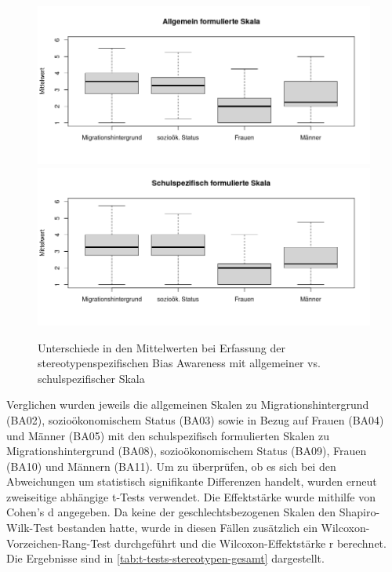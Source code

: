 \begin{figure}[h!]
	\includegraphics[width=\textwidth]{resources/boxplot-stereotypen-1-gesamt.png}
	\includegraphics[width=\textwidth]{resources/boxplot-stereotypen-2-gesamt.png}
	\caption{Unterschiede in den Mittelwerten bei Erfassung der stereotypenspezifischen Bias Awareness mit allgemeiner vs. schulspezifischer Skala}
	\label{fig:boxplot-stereotypen-gesamt}
\end{figure}

Verglichen wurden jeweils die allgemeinen Skalen zu Migrationshintergrund (BA02), sozioökonomischem Status (BA03) sowie in Bezug auf Frauen (BA04) und Männer (BA05) mit den schulspezifisch formulierten Skalen zu Migrationshintergrund (BA08), sozioökonomischem Status (BA09), Frauen (BA10) und Männern (BA11).
Um zu überprüfen, ob es sich bei den Abweichungen um statistisch signifikante Differenzen handelt, wurden erneut zweiseitige abhängige t-Tests verwendet.
Die Effektstärke wurde mithilfe von Cohen's d angegeben.
Da keine der geschlechtsbezogenen Skalen den Shapiro-Wilk-Test bestanden hatte, wurde in diesen Fällen zusätzlich ein Wilcoxon-Vorzeichen-Rang-Test durchgeführt und die Wilcoxon-Effektstärke r berechnet.
Die Ergebnisse sind in \autoref{tab:t-tests-stereotypen-gesamt} dargestellt.

